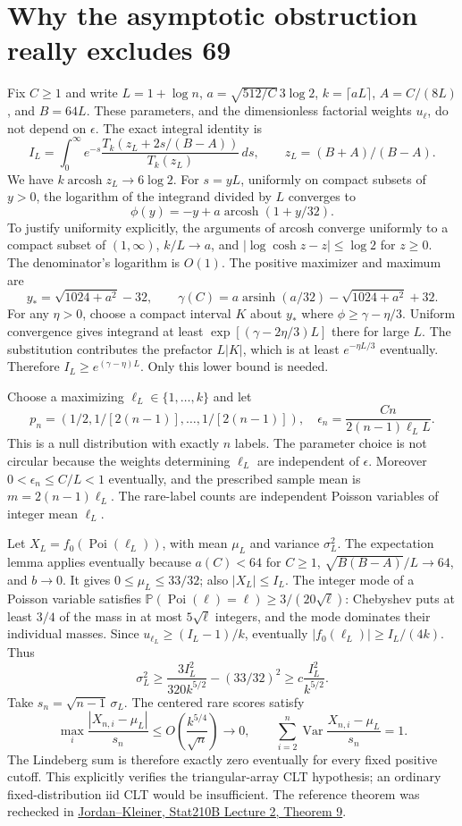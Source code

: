 \documentclass[10pt]{article}
\newcommand{\Prb}{\mathbb P}
\newcommand{\Var}{\operatorname{Var}}
\begin{document}
\section{Why the asymptotic obstruction really excludes 69}
Fix $C\ge1$ and write $L=1+\log n$,
$a=\sqrt{512/C}\,3\log2$, $k=\lceil aL\rceil$,
$A=C/(8L)$, and $B=64L$. These parameters, and the dimensionless
factorial weights $u_\ell$, do not depend on $\epsilon$.
The exact integral identity is
\[
I_L=\int_0^\infty e^{-s}
\frac{T_k(z_L+2s/(B-A))}{T_k(z_L)}\,ds,
\qquad z_L=(B+A)/(B-A).
\]
We have $k\operatorname{arcosh}z_L\to6\log2$.
For $s=yL$, uniformly on compact subsets of $y>0$,
the logarithm of the integrand divided by $L$ converges to
\[
\phi(y)=-y+a\operatorname{arcosh}(1+y/32).
\]
To justify uniformity explicitly, the arguments of arcosh converge
uniformly to a compact subset of $(1,\infty)$, $k/L\to a$, and
$|\log\cosh z-z|\le\log2$ for $z\ge0$. The denominator's logarithm
is $O(1)$. The positive maximizer and maximum are
\[
y_* = \sqrt{1024+a^2}-32,\qquad
\gamma(C)=a\operatorname{arsinh}(a/32)-\sqrt{1024+a^2}+32.
\]
For any $\eta>0$, choose a compact interval $K$ about $y_*$ where
$\phi\ge\gamma-\eta/3$. Uniform convergence gives integrand at least
$\exp[(\gamma-2\eta/3)L]$ there for large $L$. The substitution contributes
the prefactor $L|K|$, which is at least $e^{-\eta L/3}$ eventually.
Therefore $I_L\ge e^{(\gamma-\eta)L}$. Only this lower bound is needed.

Choose a maximizing $\ell_L\in\{1,\ldots,k\}$ and let
\[
p_n=(1/2,1/[2(n-1)],\ldots,1/[2(n-1)]),\quad
\epsilon_n=\frac{Cn}{2(n-1)\ell_LL}.
\]
This is a null distribution with exactly $n$ labels. The parameter choice
is not circular because the weights determining $\ell_L$ are independent
of $\epsilon$. Moreover $0<\epsilon_n\le C/L<1$ eventually, and the
prescribed sample mean is $m=2(n-1)\ell_L$. The rare-label counts are
independent Poisson variables of integer mean $\ell_L$.

Let $X_L=f_0(\operatorname{Poi}(\ell_L))$, with mean $\mu_L$ and
variance $\sigma_L^2$. The expectation lemma applies eventually because
$a(C)<64$ for $C\ge1$, $\sqrt{B(B-A)}/L\to64$, and $b\to0$.
It gives $0\le\mu_L\le33/32$; also $|X_L|\le I_L$.
The integer mode of a Poisson variable satisfies
$\Prb(\operatorname{Poi}(\ell)=\ell)\ge3/(20\sqrt\ell)$:
Chebyshev puts at least $3/4$ of the mass in at most $5\sqrt\ell$
integers, and the mode dominates their individual masses.
Since $u_{\ell_L}\ge(I_L-1)/k$, eventually
$|f_0(\ell_L)|\ge I_L/(4k)$. Thus
\[
\sigma_L^2\ge\frac{3I_L^2}{320k^{5/2}}-(33/32)^2
\ge c\frac{I_L^2}{k^{5/2}}.
\]
Take $s_n=\sqrt{n-1}\,\sigma_L$. The centered rare scores satisfy
\[
\max_i\frac{|X_{n,i}-\mu_L|}{s_n}
 \le O\left(\frac{k^{5/4}}{\sqrt n}\right)\to0,
\qquad \sum_{i=2}^n\Var\frac{X_{n,i}-\mu_L}{s_n}=1.
\]
The Lindeberg sum is therefore exactly zero eventually for every fixed
positive cutoff. This explicitly verifies the triangular-array CLT
hypothesis; an ordinary fixed-distribution iid CLT would be insufficient.
The reference theorem was rechecked in
\href{https://people.eecs.berkeley.edu/~jordan/courses/210B-spring07/lectures/stat210b_lecture_2.pdf}
{Jordan--Kleiner, Stat210B Lecture 2, Theorem 9}.
\end{document}

